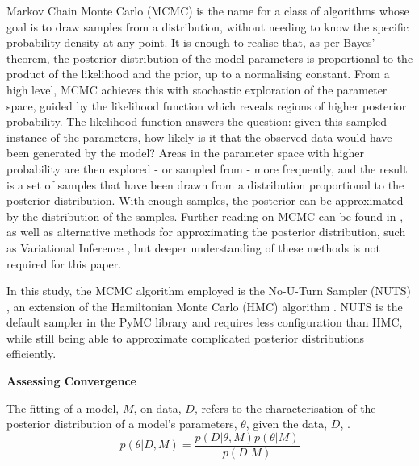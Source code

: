 Markov Chain Monte Carlo (MCMC) is the name for a class of algorithms whose
goal is to draw samples from a distribution, without needing to know the
specific probability density at any point. It is enough to realise that, as per
Bayes' theorem, the posterior distribution of the model parameters is
proportional to the product of the likelihood and the prior, up to a
normalising constant. From a high level, MCMC achieves this with stochastic
exploration of the parameter space, guided by the likelihood function which
reveals regions of higher posterior probability. The likelihood function answers the
question: given this sampled instance of the parameters, how likely is it that
the observed data would have been generated by the model? Areas in the
parameter space with higher probability are then explored - or sampled from -
more frequently, and the result is a set of samples that have been drawn from a
distribution proportional to the posterior distribution. With enough samples,
the posterior can be approximated by the distribution of the samples.
Further reading on MCMC can be found in \cite{mcmc}, as well as alternative
methods for approximating the posterior distribution, such as Variational
Inference \cite{vi}, but deeper understanding of these methods is not required
for this paper.

In this study, the MCMC algorithm employed is the No-U-Turn Sampler (NUTS)
\cite{nuts}, an extension of the Hamiltonian Monte Carlo (HMC) algorithm
\cite{hmc}. NUTS is the default sampler in the PyMC library \cite{pymc} and
requires less configuration than HMC, while still being able to approximate
complicated posterior distributions efficiently.

\textbf{Assessing Convergence}

The fitting of a model, $M$, on data, $D$, refers to the characterisation of
the posterior distribution of a model's parameters, $\theta$, given the data,
$D$, \cite{pymc-modelling}.
\begin{equation}
  \label{eq:posterior}
  p(\theta|D,M) = \frac{p(D|\theta,M)p(\theta|M)}{p(D|M)}
\end{equation}

